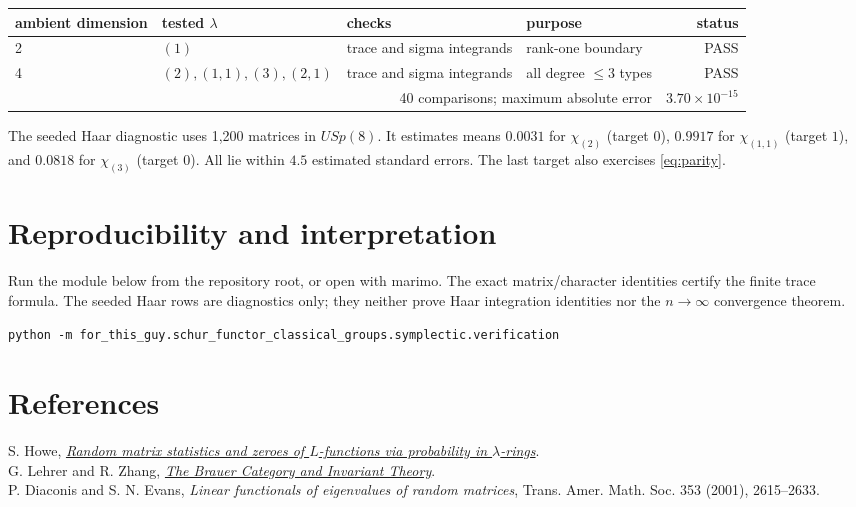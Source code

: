 \documentclass[11pt]{article}
\begin{document}
\begin{center}\small\begin{tabular}{@{}llllr@{}}\toprule
ambient dimension & tested $\lambda$ & checks & purpose & status\\\midrule
2 & $(1)$ & trace and sigma integrands & rank-one boundary & PASS\\
4 & $(2),(1,1),(3),(2,1)$ & trace and sigma integrands & all degree $\le3$ types & PASS\\\midrule
\multicolumn{4}{r}{40 comparisons; maximum absolute error} & $3.70\times10^{-15}$\\\bottomrule
\end{tabular}\end{center}

The seeded Haar diagnostic uses 1,200 matrices in $USp(8)$. It estimates means $0.0031$ for $\chi_{(2)}$ (target $0$), $0.9917$ for $\chi_{(1,1)}$ (target $1$), and $0.0818$ for $\chi_{(3)}$ (target $0$). All lie within $4.5$ estimated standard errors. The last target also exercises \eqref{eq:parity}.

\section{Reproducibility and interpretation}
Run the module below from the repository root, or open  with marimo. The exact matrix/character identities certify the finite trace formula.  The seeded Haar rows are diagnostics only; they neither prove Haar integration identities nor the $n\to\infty$ convergence theorem.
\begin{center}\footnotesize\texttt{python -m for\_this\_guy.schur\_functor\_classical\_groups.symplectic.verification}\end{center}

\section*{References}
S. Howe, \href{https://arxiv.org/abs/2412.19295}{\emph{Random matrix statistics and zeroes of $L$-functions via probability in $\lambda$-rings}}.\\
G. Lehrer and R. Zhang, \href{https://arxiv.org/abs/1207.5889}{\emph{The Brauer Category and Invariant Theory}}.
\\P. Diaconis and S. N. Evans, \emph{Linear functionals of eigenvalues of
random matrices}, Trans. Amer. Math. Soc. 353 (2001), 2615--2633.
\end{document}
